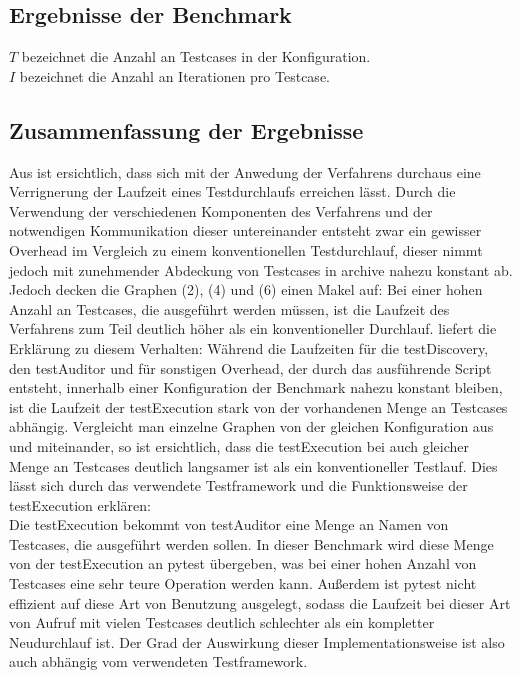 \newpage
\subsection{Ergebnisse der Benchmark}\label{chap:result_benchmark}
$T$ bezeichnet die Anzahl an Testcases in der Konfiguration.\\
$I$ bezeichnet die Anzahl an Iterationen pro Testcase.


\subsection{Zusammenfassung der Ergebnisse}
Aus  ist ersichtlich, dass sich mit der Anwedung der Verfahrens durchaus eine Verrignerung der Laufzeit eines Testdurchlaufs erreichen lässt. Durch die Verwendung der verschiedenen Komponenten des Verfahrens und der notwendigen Kommunikation dieser untereinander entsteht zwar ein gewisser Overhead im Vergleich zu einem konventionellen Testdurchlauf, dieser nimmt jedoch mit zunehmender Abdeckung von Testcases in archive nahezu konstant ab.\\
Jedoch decken die Graphen (2), (4) und (6) einen Makel auf: Bei einer hohen Anzahl an Testcases, die ausgeführt werden müssen, ist die Laufzeit des Verfahrens zum Teil deutlich höher als ein konventioneller Durchlauf.  liefert die Erklärung zu diesem Verhalten: Während die Laufzeiten für die testDiscovery, den testAuditor und für sonstigen Overhead, der durch das ausführende Script entsteht, innerhalb einer Konfiguration der Benchmark nahezu konstant bleiben, ist die Laufzeit der testExecution stark von der vorhandenen Menge an Testcases abhängig. Vergleicht man einzelne Graphen von der gleichen Konfiguration aus  und  miteinander, so ist ersichtlich, dass die testExecution bei auch gleicher Menge an Testcases deutlich langsamer ist als ein konventioneller Testlauf. Dies lässt sich durch das verwendete Testframework und die Funktionsweise der testExecution erklären:\\
Die testExecution bekommt von testAuditor eine Menge an Namen von Testcases, die ausgeführt werden sollen. In dieser Benchmark wird diese Menge von der testExecution an pytest übergeben, was bei einer hohen Anzahl von Testcases eine sehr teure Operation werden kann. Außerdem ist pytest nicht effizient auf diese Art von Benutzung ausgelegt, sodass die Laufzeit bei dieser Art von Aufruf mit vielen Testcases deutlich schlechter als ein kompletter Neudurchlauf ist. Der Grad der Auswirkung dieser Implementationsweise ist also auch abhängig vom verwendeten Testframework.\\

